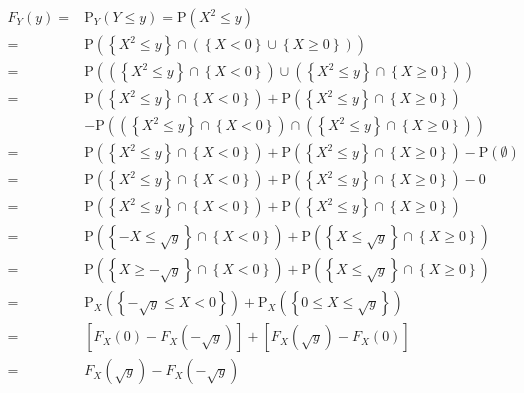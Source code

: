 \documentclass[
]{book}
\theoremstyle{definition}
\theoremstyle{definition}
\theoremstyle{definition}
\theoremstyle{definition}
\theoremstyle{remark}
\begin{document}
\[
\begin{aligned}
F_{{\scriptscriptstyle Y}}\left(y\right)= & \mathrm{P}_{{\scriptscriptstyle Y}}\left(Y\le y\right)=\mathrm{P}\left(X^{2}\le y\right)\\
= & \mathrm{P}\left(\left\{ X^{2}\le y\right\} \cap\left(\left\{ X<0\right\} \cup\left\{ X\ge0\right\} \right)\right)\\
= & \mathrm{P}\left(\left(\left\{ X^{2}\le y\right\} \cap\left\{ X<0\right\} \right)\cup\left(\left\{ X^{2}\le y\right\} \cap\left\{ X\ge0\right\} \right)\right)\\
= & \mathrm{P}\left(\left\{ X^{2}\le y\right\} \cap\left\{ X<0\right\} \right)+\mathrm{P}\left(\left\{ X^{2}\le y\right\} \cap\left\{ X\ge0\right\} \right)\\
 & -\mathrm{P}\left(\left(\left\{ X^{2}\le y\right\} \cap\left\{ X<0\right\} \right)\cap\left(\left\{ X^{2}\le y\right\} \cap\left\{ X\ge0\right\} \right)\right)\\
= & \mathrm{P}\left(\left\{ X^{2}\le y\right\} \cap\left\{ X<0\right\} \right)+\mathrm{P}\left(\left\{ X^{2}\le y\right\} \cap\left\{ X\ge0\right\} \right)-\mathrm{P}\left(\emptyset\right)\\
= & \mathrm{P}\left(\left\{ X^{2}\le y\right\} \cap\left\{ X<0\right\} \right)+\mathrm{P}\left(\left\{ X^{2}\le y\right\} \cap\left\{ X\ge0\right\} \right)-0\\
= & \mathrm{P}\left(\left\{ X^{2}\le y\right\} \cap\left\{ X<0\right\} \right)+\mathrm{P}\left(\left\{ X^{2}\le y\right\} \cap\left\{ X\ge0\right\} \right)\\
= & \mathrm{P}\left(\left\{ -X\le\sqrt{y}\right\} \cap\left\{ X<0\right\} \right)+\mathrm{P}\left(\left\{ X\le\sqrt{y}\right\} \cap\left\{ X\ge0\right\} \right)\\
= & \mathrm{P}\left(\left\{ X\ge-\sqrt{y}\right\} \cap\left\{ X<0\right\} \right)+\mathrm{P}\left(\left\{ X\le\sqrt{y}\right\} \cap\left\{ X\ge0\right\} \right)\\
= & \mathrm{P}_{{\scriptscriptstyle X}}\left(\left\{ -\sqrt{y}\le X<0\right\} \right)+\mathrm{P}_{{\scriptscriptstyle X}}\left(\left\{ 0\le X\le\sqrt{y}\right\} \right)\\
= & \left[F_{{\scriptscriptstyle X}}\left(0\right)-F_{{\scriptscriptstyle X}}\left(-\sqrt{y}\right)\right]+\left[F_{{\scriptscriptstyle X}}\left(\sqrt{y}\right)-F_{{\scriptscriptstyle X}}\left(0\right)\right]\\
= & F_{{\scriptscriptstyle X}}\left(\sqrt{y}\right)-F_{{\scriptscriptstyle X}}\left(-\sqrt{y}\right)
\end{aligned}
\]
\end{document}
